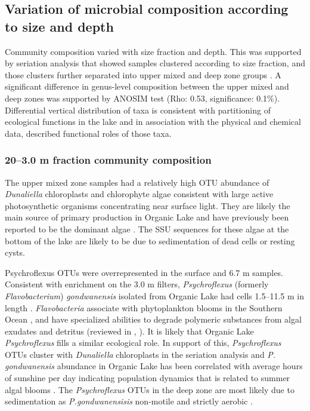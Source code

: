 \subsection{Variation of microbial composition according to size and depth}
Community composition varied with size fraction and depth. 
This was supported by seriation analysis that showed samples clustered according to size fraction, and those clusters further separated into upper mixed and deep zone groups . 
A significant difference in genus-level composition between the upper mixed and deep zones was supported by \ac{ANOSIM} test (Rho: 0.53, significance: 0.1\%). 
Differential vertical distribution of taxa is consistent with partitioning of ecological functions in the lake and in association with the physical and chemical data, described functional roles of those taxa.


\subsubsection{20--3.0 \textmu{}m fraction community composition}
The upper mixed zone samples had a relatively high \ac{OTU} abundance of \emph{Dunaliella} chloroplasts and chlorophyte algae consistent with large active photosynthetic organisms concentrating near surface light. 
They are likely the main source of primary production in Organic Lake and have previously been reported to be the dominant algae \cite{Franzmann1987b}. 
The \ac{SSU} sequences for these algae at the bottom of the lake are likely to be due to sedimentation of dead cells or resting cysts.

Psychroflexus \acp{OTU} were overrepresented in the surface and 6.7 m samples. 
Consistent with enrichment on the 3.0 \textmu{}m filters, \emph{Psychroflexus} (formerly \emph{Flavobacterium}) \emph{gondwanensis} \cite{Bowman1998} isolated from Organic Lake \cite{Franzmann1987b} had cells 1.5--11.5 \textmu{}m in length \cite{Dobson1991}. 
\emph{Flavobacteria} associate with phytoplankton blooms in the Southern Ocean \cite{Abell2005a, Abell2005b, Williams2012}, and have specialized abilities to degrade polymeric substances from algal exudates and detritus (reviewed in \citet{Kirchman2002}, \cite{Williams2012}). 
It is likely that Organic Lake \emph{Psychroflexus} fills a similar ecological role. 
In support of this, \emph{Psychroflexus} \acp{OTU} cluster with \emph{Dunaliella} chloroplasts in the seriation analysis  and \emph{P. gondwanensis} abundance in Organic Lake has been correlated with average hours of sunshine per day indicating population dynamics that is related to summer algal blooms \cite{James1994}. 
The \emph{Psychroflexus} \acp{OTU} in the deep zone are most likely due to sedimentation as \emph{P.gondwanensisis} non-motile and strictly aerobic \cite{Dobson1991}.

